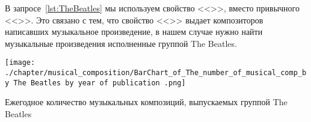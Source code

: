 \begin{enumerate}
В запросе~\ref{lst:TheBeatles} мы используем свойство <<>>, вместо привычного <<>>. Это связано с тем, что свойство <<>> выдает композиторов написавших музыкальное произведение, в нашем случае нужно найти музыкальные произведения исполненные группой The Beatles.

\begin{marginfigure}
	\texttt{[image: ./chapter/musical\_composition/BarChart\_of\_The\_number\_of\_musical\_comp\_by The Beatles by year of publication .png]}
	\caption[Гистограмма количества музыкальных композиций The Beatles по годам издания]{Ежегодное количество музыкальных композиций, выпускаемых группой The Beatles}%
 	\label{fig:ThebeatlesBubbleChart}%
\end{marginfigure}
\end{enumerate}
